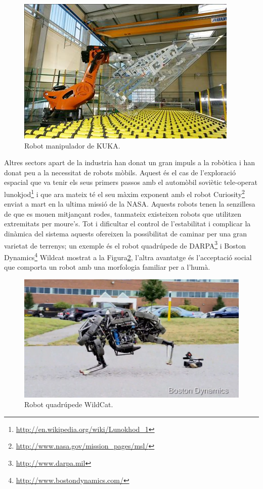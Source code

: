 \documentclass[12pt,a4paper,final,twoside]{article}
\begin{document}
\begin{figure}[h!]
	\centering
    \includegraphics[scale=3]	{images/kuka.jpg}
	 \caption{Robot manipulador de KUKA.}
  \label{fig:kuka}
\end{figure}

Altres sectors apart de la industria han donat un gran impuls a la robòtica i han donat peu a la necessitat de robots mòbils. Aquest és el cas de l'exploració espacial que va tenir els seus primers passos amb el automòbil soviètic tele-operat lunokjod\footnote{\url{http://en.wikipedia.org/wiki/Lunokhod_1}} i que ara mateix té el seu màxim exponent amb el robot Curiosity\footnote{\url{http://www.nasa.gov/mission_pages/msl/}} enviat a mart en la ultima missió de la NASA. Aquests robots tenen la senzillesa de que es mouen mitjançant rodes, tanmateix existeixen robots que utilitzen extremitats per moure's. Tot i dificultar el control de l'estabilitat i complicar la dinàmica del sistema aquests ofereixen la possibilitat de caminar per una gran varietat de terrenys; un exemple és el robot quadrúpede de DARPA\footnote{\url{http://www.darpa.mil}} i Boston Dynamics\footnote{\url{http://www.bostondynamics.com/}} Wildcat mostrat a la Figura\ref{fig:wildcat}, l'altra avantatge és l'acceptació social que comporta un robot amb una morfologia familiar per a l'humà. 

\begin{figure}[h!]
	\centering
    \includegraphics[scale=0.6]	{images/Wildcat.jpg}
	 \caption{Robot quadrúpede WildCat.}
  \label{fig:wildcat}
\end{figure}
\end{document}

